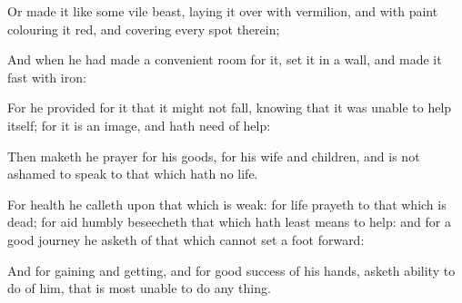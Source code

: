 {\par }{\PP {}Or made it like some vile beast, laying it over with vermilion, and with paint colouring it red, and covering every spot therein;
\par }{\PP {}And when he had made a convenient room for it, set it in a wall, and made it fast with iron:
\par }{\PP {}For he provided for it that it might not fall, knowing that it was unable to help itself; for it is an image, and hath need of help:
\par }{\PP {}Then maketh he prayer for his goods, for his wife and children, and is not ashamed to speak to that which hath no life.
\par }{\PP {}For health he calleth upon that which is weak: for life prayeth to that which is dead; for aid humbly beseecheth that which hath least means to help: and for a good journey he asketh of that which cannot set a foot forward:
\par }{\PP {}And for gaining and getting, and for good success of his hands, asketh ability to do of him, that is most unable to do any thing.

}
